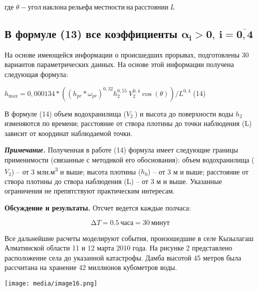 \documentclass[
]{article}
\begin{document}
где \(\theta - угол\ наклона\ рельефа\ местности\ на\ расстоянии\ L\)

\subsection{\texorpdfstring{В формуле (13) все коэффициенты
\(\mathbf{\alpha}_{\mathbf{i}}\mathbf{>}\mathbf{0,\ }\mathbf{i}\mathbf{=}\overline{\mathbf{0,4}}\)
}{В формуле (13) все коэффициенты \textbackslash mathbf\{\textbackslash alpha\}\_\{\textbackslash mathbf\{i\}\}\textbackslash mathbf\{\textgreater\}\textbackslash mathbf\{0,\textbackslash{} \}\textbackslash mathbf\{i\}\textbackslash mathbf\{=\}\textbackslash overline\{\textbackslash mathbf\{0,4\}\} }}\label{ux432-ux444ux43eux440ux43cux443ux43bux435-13-ux432ux441ux435-ux43aux43eux44dux444ux444ux438ux446ux438ux435ux43dux442ux44b-mathbfalpha_mathbfimathbfmathbf0-mathbfimathbfoverlinemathbf04}

На основе имеющейся информации о происшедших прорывах, подготовлены 30
вариантов параметрических данных. На основе этой информации получена
следующая формула:

\(h_{\max} = 0,000134*(\left( h_{pr}*\omega_{pr} \right)^{0,32}h_{2}^{0,55}\ V_{2}^{0,4}\cos(\theta))/L^{0,4}\)
(14)

В формуле (14) объем водохранилища (\(V_{2}\ \)) и высота до поверхности
воды \(h_{2}\) изменяются по времени; расстояние от створа плотины до
точки наблюдения (L) зависит от координат наблюдаемой точки.

\emph{\textbf{Примечание.}} Полученная в работе (14) формула имеет
следующие границы применимости (связанные с методикой его обоснования):
объем водохранилища (\(V_{2}\)) -- от 3 млн.м\textsuperscript{3} и выше;
высота плотины (\(h_{0}\)) -- от 3 м и выше; расстояние от створа
плотины до створа наблюдения (L) -- от 3 м и выше. Указанные ограничения
не препятствуют практическим интересам.

\textbf{Обсуждение и результаты.} Отсчет ведется каждые полчаса:

\[\mathrm{\Delta}T = 0.5\ часа = 30\ минут\]

Все дальнейшие расчеты моделируют события, произошедшие в селе Кызылагаш
Алматинской области 11 и 12 марта 2010 года. На рисунке 2 представлено
расположение села до указанной катастрофы. Дамба высотой 45 метров была
рассчитана на хранение 42 миллионов кубометров воды.

\texttt{[image: media/image16.png]}
\end{document}
